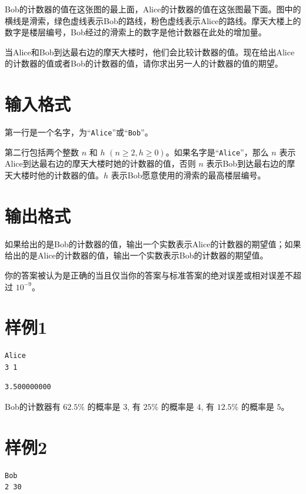\documentclass[11pt, a4paper]{article}
\begin{document}
Bob的计数器的值在这张图的最上面，Alice的计数器的值在这张图最下面。图中的横线是滑索，绿色虚线表示Bob的路线，粉色虚线表示Alice的路线。摩天大楼上的数字是楼层编号，Bob经过的滑索上的数字是他计数器在此处的增加量。

当Alice和Bob到达最右边的摩天大楼时，他们会比较计数器的值。现在给出Alice的计数器的值或者Bob的计数器的值，请你求出另一人的计数器的值的期望。

\section*{输入格式}
第一行是一个名字，为``\texttt{Alice}''或``\texttt{Bob}''。

第二行包括两个整数 $n$ 和 $h$ $(n \geq 2, h \geq 0)$。如果名字是``\texttt{Alice}''，那么 $n$ 表示Alice到达最右边的摩天大楼时她的计数器的值，否则 $n$ 表示Bob到达最右边的摩天大楼时他的计数器的值。$h$ 表示Bob愿意使用的滑索的最高楼层编号。

\section*{输出格式}
如果给出的是Bob的计数器的值，输出一个实数表示Alice的计数器的期望值；如果给出的是Alice的计数器的值，输出一个实数表示Bob的计数器的期望值。

你的答案被认为是正确的当且仅当你的答案与标准答案的绝对误差或相对误差不超过 $10^{-9}$。

\section*{样例1}
\begin{Verbatim}[frame=single, label=input]
Alice
3 1

\end{Verbatim}

\begin{Verbatim}[frame=single, label=output]
3.500000000

\end{Verbatim}
Bob的计数器有 $62.5\%$ 的概率是 $3$, 有 $25\%$ 的概率是 $4$, 有 $12.5\%$ 的概率是 $5$。

\section*{样例2}
\begin{Verbatim}[frame=single, label=input]
Bob
2 30

\end{Verbatim}
\end{document}
